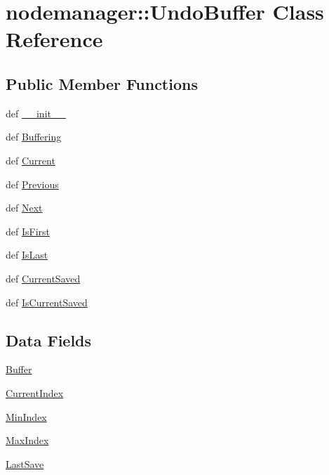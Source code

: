 \hypertarget{classnodemanager_1_1UndoBuffer}{
\section{nodemanager::Undo\-Buffer Class Reference}
\label{classnodemanager_1_1UndoBuffer}
}
\subsection*{Public Member Functions}
\begin{CompactItemize}
\item 
def \hyperlink{classnodemanager_1_1UndoBuffer_f7faebec57947fa103b8ad9d2b726f04}{\_\-\_\-init\_\-\_\-}
\item 
def \hyperlink{classnodemanager_1_1UndoBuffer_22639d6b02995759c718dbb775bc8b7d}{Buffering}
\item 
def \hyperlink{classnodemanager_1_1UndoBuffer_8f121c407be19f42f10ccc2518227dd3}{Current}
\item 
def \hyperlink{classnodemanager_1_1UndoBuffer_8c689bee39a62cf857525787f6def0a4}{Previous}
\item 
def \hyperlink{classnodemanager_1_1UndoBuffer_a29ba64843a2d852b28cc01b411ce06f}{Next}
\item 
def \hyperlink{classnodemanager_1_1UndoBuffer_2ff748b5b8445e36cac96fd5726dc80e}{Is\-First}
\item 
def \hyperlink{classnodemanager_1_1UndoBuffer_87ef542c80367efcb4f5d8c97dabc4de}{Is\-Last}
\item 
def \hyperlink{classnodemanager_1_1UndoBuffer_351f7c0312c72b4fd49b34e56e6449f1}{Current\-Saved}
\item 
def \hyperlink{classnodemanager_1_1UndoBuffer_8d3fd5b2285366f941cc02489a16ea32}{Is\-Current\-Saved}
\end{CompactItemize}
\subsection*{Data Fields}
\begin{CompactItemize}
\item 
\hyperlink{classnodemanager_1_1UndoBuffer_7519445d4c5da6ace730aef461bb5ff4}{Buffer}
\item 
\hyperlink{classnodemanager_1_1UndoBuffer_ac3ba6b2edb998e1d3c2c3ca5163b200}{Current\-Index}
\item 
\hyperlink{classnodemanager_1_1UndoBuffer_efcb3fd67a5a77e1cffe5ee2d6fb612d}{Min\-Index}
\item 
\hyperlink{classnodemanager_1_1UndoBuffer_51d3531c9b7ab75b2a4d6a5f49ebc15e}{Max\-Index}
\item 
\hyperlink{classnodemanager_1_1UndoBuffer_abfc1f3adfc21d88b4382b410b9991d9}{Last\-Save}
\end{CompactItemize}


